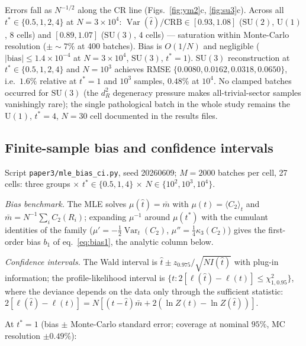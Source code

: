 \documentclass[11pt]{article}
\theoremstyle{remark}
\theoremstyle{plain}
\newcommand{\Var}{\operatorname{Var}}
\begin{document}
Errors fall as $N^{-1/2}$ along the CR line (Figs.~\ref{fig:ym2}c, \ref{fig:su3}c). Across all $t^* \in \{0.5, 1, 2, 4\}$ at $N = 3\times10^4$: $\Var(\hat t)/\mathrm{CRB} \in [0.93, 1.08]$ ($\mathrm{SU}(2)$, $\mathrm{U}(1)$, 8 cells) and $[0.89, 1.07]$ ($\mathrm{SU}(3)$, 4 cells) --- saturation within Monte-Carlo resolution ($\pm{\sim}7\%$ at 400 batches). Bias is $O(1/N)$ and negligible ($|\mathrm{bias}| \leq 1.4\times10^{-4}$ at $N = 3\times10^4$, $\mathrm{SU}(3)$, $t^* = 1$). $\mathrm{SU}(3)$ reconstruction at $t^* \in \{0.5, 1, 2, 4\}$ and $N = 10^3$ achieves RMSE $\{0.0080, 0.0162, 0.0318, 0.0650\}$, i.e.\ $1.6\%$ relative at $t^* = 1$ and $10^3$ samples, $0.48\%$ at $10^4$. No clamped batches occurred for $\mathrm{SU}(3)$ (the $d_R^2$ degeneracy pressure makes all-trivial-sector samples vanishingly rare); the single pathological batch in the whole study remains the $\mathrm{U}(1)$, $t^* = 4$, $N = 30$ cell documented in the results files.

\subsection{Finite-sample bias and confidence intervals}\label{sec:biasci}

Script \texttt{paper3/mle\_bias\_ci.py}, seed 20260609; $M = 2000$ batches per cell, 27 cells: three groups $\times$ $t^* \in \{0.5, 1, 4\}$ $\times$ $N \in \{10^2, 10^3, 10^4\}$.

\emph{Bias benchmark.} The MLE solves $\mu(\hat t) = \bar m$ with $\mu(t) = \langle C_2\rangle_t$ and $\bar m = N^{-1}\sum_i C_2(R_i)$; expanding $\mu^{-1}$ around $\mu(t^*)$ with the cumulant identities of the family ($\mu' = -\tfrac12\Var_t(C_2)$, $\mu'' = \tfrac14\kappa_3(C_2)$) gives the first-order bias $b_1$ of eq.~\eqref{eq:bias1}, the analytic column below.

\emph{Confidence intervals.} The Wald interval is $\hat t \pm z_{0.975}/\sqrt{N I(\hat t)}$ with plug-in information; the profile-likelihood interval is $\{t : 2[\ell(\hat t) - \ell(t)] \leq \chi^2_{1, 0.95}\}$, where the deviance depends on the data only through the sufficient statistic: $2[\ell(\hat t) - \ell(t)] = N[(t - \hat t)\bar m + 2(\ln Z(t) - \ln Z(\hat t))]$.

At $t^* = 1$ (bias $\pm$ Monte-Carlo standard error; coverage at nominal $95\%$, MC resolution $\pm 0.49\%$):
\end{document}
